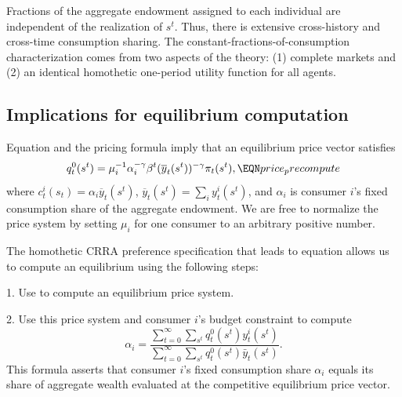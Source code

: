 Fractions  of the aggregate endowment assigned to each
individual are independent of the realization of $s^t$.    Thus,
there is extensive cross-history and cross-time consumption
sharing. The constant-fractions-of-consumption characterization
comes from two aspects of the theory: (1) complete markets
and (2) an identical  homothetic one-period utility function for all agents.


\subsection{Implications for equilibrium computation}\label{sec:compeasy}%
\noindent Equation  and the pricing formula
 imply that an equilibrium price vector satisfies
$$ q_t^0(s^t) = \mu_i^{-1} \alpha_i^{-\gamma} \beta^t (\overline y_t(s^t))^{-\gamma} \pi_t(s^t) , \EQN price_precompute$$
where $c_t^i(s_t) = \alpha_i \overline y_t(s^t)$, $\overline y_t(s^t) = \sum_i y_t^i(s^t)$, and $\alpha_i$ is consumer $i$'s
fixed consumption share of the aggregate endowment.
We are free to normalize the price system by setting 
$\mu_i$
for one consumer to an arbitrary positive number.

The homothetic CRRA preference specification that leads to equation  allows us to compute an equilibrium
using the following steps:
\medskip
\item{1.} Use  to compute an equilibrium price system.

\medskip
\item{2.} Use this price system and consumer $i$'s budget constraint to compute
$$ \alpha_i = {\frac {\sum_{t=0}^\infty \sum_{s^t} q_t^0(s^t) y_t^i(s^t) } {\sum_{t=0}^\infty \sum_{s^t} q_t^0(s^t) \bar y_t(s^t)  } } .$$
This formula asserts that consumer $i$'s fixed consumption share $\alpha_i$ equals its share of aggregate wealth evaluated at the competitive  equilibrium price vector.



